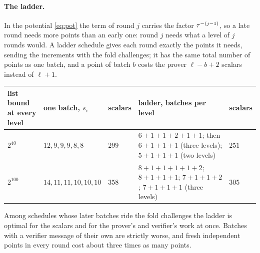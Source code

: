 \paragraph{The ladder.} In the potential \eqref{eq:pot} the term of round $j$ carries the factor $\tau^{-(j-1)}$, so a late round needs more points than an early one: round $j$ needs what a level of $j$ rounds would. A ladder schedule gives each round exactly the points it needs, sending the increments with the fold challenges; it has the same total number of points as one batch, and a point of batch $b$ costs the prover $\ell-b+2$ scalars instead of $\ell+1$.
\begin{center}
\small
\begin{tabularx}{\textwidth}{@{}lllXl@{}}
\toprule
list bound at every level & one batch, $s_i$ & scalars & ladder, batches per level & scalars\\
\midrule
$2^{40}$ & $12,9,9,9,8,8$ & $299$ & $6{+}1{+}1{+}2{+}1{+}1$; then $6{+}1{+}1{+}1$ (three levels); $5{+}1{+}1{+}1$ (two levels) & $251$\\
$2^{100}$ & $14,11,11,10,10,10$ & $358$ & $8{+}1{+}1{+}1{+}1{+}2$; $8{+}1{+}1{+}1$; $7{+}1{+}1{+}2$; $7{+}1{+}1{+}1$ (three levels) & $305$\\
\bottomrule
\end{tabularx}
\end{center}
Among schedules whose later batches ride the fold challenges the ladder is optimal for the scalars and for the prover's and verifier's work at once. Batches with a verifier message of their own are strictly worse, and fresh independent points in every round cost about three times as many points.

